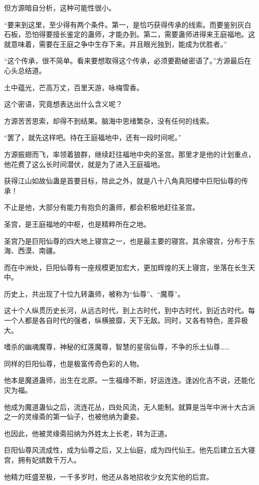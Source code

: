 \begin{this_body}
但方源暗自分析，这种可能性很小。

“要来到这里，至少得有两个条件。第一，是恰巧获得传承的线索。而要鉴别灰白石板，恐怕得要擅长鉴定的蛊师，才能办到。第二，需要蛊师进得来王庭福地。这就意味着，需要在王庭之争中生存下来。并且眼光独到，能成为优胜者。”

“这个传承，很不简单。看来要想取得这个传承，必须要勘破密语了。”方源最后在心头总结道。

土中蕴光，芒高万丈，百里天游，咏梅雪香。

这个密语，究竟想表达出什么含义呢？

方源苦苦思索，却得不到结果。脑海中思绪繁杂，没有任何的线索。

“罢了，就先这样吧。待在王庭福地中，还有一段时间呢。”

方源振翅而飞，率领着狼群，继续赶往福地中央的圣宫。那里才是他的计划重点，他花费了这么长时间潜伏，就是为了进入王庭福地。

获得江山如故仙蛊是首要目标，除此之外，就是八十八角真阳楼中巨阳仙尊的传承！

不止是他，大部分有能力有抱负的蛊师，都会积极地赶往圣宫。

圣宫，是王庭福地的中枢，也是精粹所在之地。

圣宫乃是巨阳仙尊的四大地上寝宫之一，也是最主要的寝宫。其余寝宫，分布于东海、西漠、南疆。

而在中洲处，巨阳仙尊有一座规模更加宏大，更加辉煌的天上寝宫，坐落在长生天中。

历史上，共出现了十位九转蛊师，被称为“仙尊”、“魔尊”。

这十个人纵贯历史长河，从远古时代，到上古时代，到中古时代，到近古时代。每一个人都是各自时代的强者，纵横披靡，天下无敌。同时，又各有特色，差异极大。

嗜杀的幽魂魔尊，神秘的红莲魔尊，智慧的星宿仙尊，不争的乐土仙尊……

同样的巨阳仙尊，也是极富传奇色彩的人物。

他本是魔道蛊师，出生在北原。一生福缘不断，好运连连。逢凶化吉不说，还能化灾为福。

他成为魔道蛊仙之后，流连花丛，四处风流，无人能制。就算是当年中洲十大古派之一的灵缘斋的第一仙子，也被他纳为妻妾。

也因此，他被灵缘斋招纳为外姓太上长老，转为正道。

巨阳仙尊风流成性，成为仙尊之后，又上仙庭，成为四代仙王。他先后建立五大寝宫，拥有妃嫔数千万人。

他精力旺盛至极，一千多岁时，他还从各地招收少女充实他的后宫。


\end{this_body}
